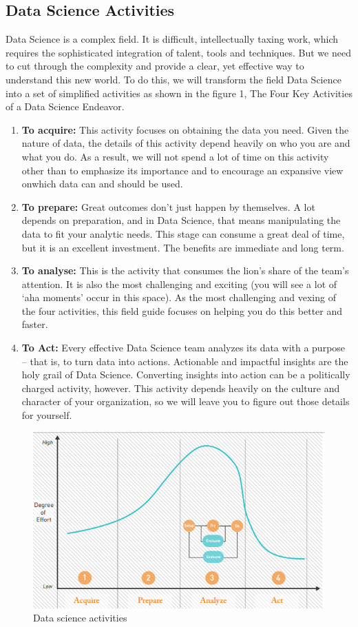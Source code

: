 \documentclass[a4paper,12pt,oneside]{report}
\begin{document}
\subsection{Data Science Activities }
{Data Science is a complex field. It is difficult, intellectually taxing work, which requires the sophisticated integration of talent, tools and techniques. But we need to cut through the complexity and provide a clear, yet effective way to understand this new world. To do this, we will transform the field Data Science into a set of simplified activities as shown in the figure 1, The Four Key Activities of a Data Science Endeavor.
\begin{enumerate}
\item \textbf {To acquire:} {This activity focuses on obtaining the data you need. Given the nature of data, the details of this activity depend heavily on who you are and what you do. As a result, we will not spend a lot of time on this activity other than to emphasize its importance and to encourage an expansive view onwhich data can and should be used.}
\item \textbf {To prepare:} {Great outcomes don’t just happen by themselves. A lot depends on preparation, and in Data Science, that means manipulating the data to fit your analytic needs.
This stage can consume a great deal of time, but it is an excellent investment. The benefits are immediate and long term.}
\item \textbf {To analyse: }{This is the activity that consumes the lion’s share of the team’s attention.
It is also the most challenging and exciting (you will see a lot of ‘aha moments’ occur in this space). As the most challenging and vexing of the four activities, this field guide focuses on helping you do this better and faster.}
\item \textbf {To Act:} {Every effective Data Science team analyzes its data with a purpose – that is, to turn data into actions. Actionable and impactful insights are the holy grail of Data Science.
Converting insights into action can be a politically charged activity, however. This activity depends heavily on the culture and character of your organization, so we will leave you to figure out those details for yourself.}
\end{enumerate}
\begin{figure}[h!]
\centering
\includegraphics[width=1\textwidth]{"Data science activities"}
\caption{Data science activities}
\end{figure}
}
\end{document}
